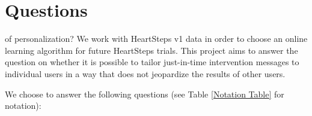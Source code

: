 
\chapter{Questions}
\label{Qustions}

 of personalization?  We work with HeartSteps v1 data in order to choose an online learning algorithm for future HeartSteps trials.  This project aims to answer the question on whether it is possible to tailor just-in-time intervention messages to individual users in a way that does not jeopardize the results of other users.

We choose to answer the following questions (see Table \ref{Notation Table} for notation):

